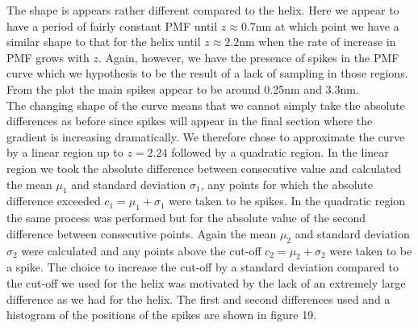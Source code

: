 \documentclass[12pt, onecolumn]{revtex4}    %
\begin{document}
The shape is appears rather different compared to the helix.  Here we appear to have a period of fairly constant PMF until $z \approx 0.7$nm at which point we have a similar shape to that for the helix until $z \approx 2.2$nm when the rate of increase in PMF grows with $z$.  Again, however, we have the presence of spikes in the PMF curve which we hypothesis to be the result of a lack of sampling in those regions.  From the plot the main spikes appear to be around 0.25nm and 3.3nm.\\

The changing shape of the curve means that we cannot simply take the absolute differences as before since spikes will appear in the final section where the gradient is increasing dramatically.  We therefore chose to approximate the curve by a linear region up to $z = 2.24$ followed by a quadratic region.  In the linear region we took the absolute difference between consecutive value and calculated the mean $\mu_1$ and standard deviation $\sigma_1$, any points for which the absolute difference exceeded $c_1 = \mu_1 + \sigma_1$ were taken to be spikes.  In the quadratic region the same process was performed but for the absolute value of the second difference between consecutive points.  Again the mean $\mu_2$ and standard deviation $\sigma_2$ were calculated and any points above the cut-off $c_2 = \mu_2 + \sigma_2$ were taken to be a spike.  The choice to increase the cut-off by a standard deviation compared to the cut-off we used for the helix was motivated by the lack of an extremely large difference as we had for the helix.  The first and second differences used and a histogram of the positions of the spikes are shown in figure 19.\\ 
\end{document}
